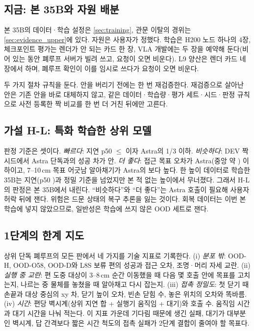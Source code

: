 \subsection{지금: 본 35B와 자원 배분}
\label{sec:milestone}
본 35B의 데이터·학습 설정은 \cref{sec:training}, 관문 이탈의 경위는 \cref{sec:evidence_upper}에 있다. 자원은 사용자가 정했다. 학습은 H200 노드 하나의 4장, 체크포인트 평가는 렌더가 안 되는 카드 한 장, VLA 개발에는 두 장을 예약해 둔다(비어 있는 동안 폐루프 서버가 빌려 쓰고, 요청이 오면 비운다). L9 양산은 렌더 카드 네 장에서 하며, 폐루프 확인이 이를 임시로 쓰다가 요청이 오면 비운다.

두 가지 절차 규칙을 둔다. 안을 버리기 전에는 한 번 재검증한다. 재검증으로 살아난 안은 기존 안을 바로 대체하지 않고, 같은 데이터·학습량·평가 세트·시드·판정 규칙으로 사전 등록한 짝 비교를 한 번 더 거친 뒤에만 고른다.

\subsection{가설 H-L: 특화 학습한 상위 모델}
\label{sec:hl}
 판정 기준은 셋이다. \emph{빠르다}: 지연 p50 $\le$ 이자 Astra의 1/3 이하. \emph{비슷하다}: DEV 짝 시드에서 Astra 단독과의 성공 차가  안. \emph{더 좋다}: 접근 목표 오차가 Astra(중앙 약 ) 이하이고, 7--10\,cm 목표 어긋남 알아채기가 Astra의 보다 높다. 한 높이 데이터로 학습한 35B는 지연(p50 )과 정밀 기준을 넘었지만 본 적 없는 높이에서 무너졌다. 그래서 H-L의 판정은 본 35B에서 내린다. ``비슷하다''와 ``더 좋다''는 Astra 호출이 필요해 사용자 허락 뒤에 잰다. 위험은 드문 상태의 복구 추론을 잃는 것이다. 회복 데이터는 이번 본 학습에 넣지 않았으므로, 일반성은 학습에 쓰지 않은 OOD 세트로 잰다.

\subsection{1단계의 한계 지도}
\label{sec:plan_limits}
상위 단독 폐루프의 모든 판에서 네 가지를 기술 지표로 기록한다. (i) \emph{분포 밖}: OOD-H, OOD-O58, OOD-D와 L8S 보류 편의 성공과 접근 오차, 조명·머리 자세 교란. (ii) \emph{실행 중 교란}: 편 도중 대상이 3--8\,cm 순간 이동했을 때 다음 몇 호출 안에 목표를 고치는지, 나르는 중 물체를 놓쳤을 때 알아채고 다시 잡는지. (iii) \emph{접촉 정밀도}: 첫 닫기 때 손끝과 대상 중심의 xy 차, 닫기 높이 오차, 빈손 닫힘 수, 놓은 위치의 오차와 똑바름. (iv) \emph{시간}: 편당 벽시계(상위 지연 합 + 실행기 움직임 + 대기)와 호출 수. 움직임 시간과 대기 시간을 나눠 적는다. 이 지표 가운데 기다림 때문에 생긴 실패, 대기가 대부분인 벽시계, 답 간격보다 짧은 시간 척도의 접촉 실패가 2단계 결합이 줄여야 할 목표다.

